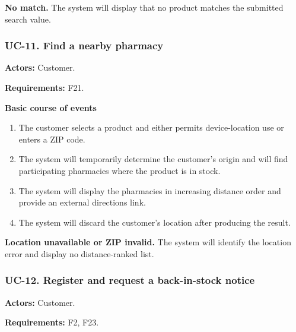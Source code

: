 \textbf{No match.} The system will display that no product matches the submitted search value.


\clearpage
\subsubsection*{UC-11. Find a nearby pharmacy}
\textbf{Actors:} Customer.

\textbf{Requirements:} F21.

\textbf{Basic course of events}
\begin{enumerate}
\item The customer selects a product and either permits device-location use or enters a ZIP code.
\item The system will temporarily determine the customer's origin and will find participating pharmacies where the product is in stock.
\item The system will display the pharmacies in increasing distance order and provide an external directions link.
\item The system will discard the customer's location after producing the result.
\end{enumerate}

\textbf{Location unavailable or ZIP invalid.} The system will identify the location error and display no distance-ranked list.


\clearpage
\subsubsection*{UC-12. Register and request a back-in-stock notice}
\textbf{Actors:} Customer.

\textbf{Requirements:} F2, F23.

